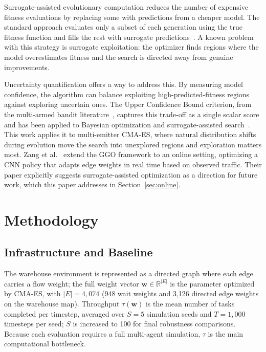 \documentclass[conference]{IEEEtran}
\begin{document}
Surrogate-assisted evolutionary computation reduces the number of expensive
fitness evaluations by replacing some with predictions from a cheaper
model. The standard approach evaluates only a subset of each generation
using the true fitness function and fills the rest with surrogate
predictions~\cite{jin2011}. A known problem with this strategy is surrogate
exploitation: the optimizer finds regions where the model overestimates
fitness and the search is directed away from genuine improvements.

Uncertainty quantification offers a way to address this. By measuring
model confidence, the algorithm can balance exploiting high-predicted-fitness
regions against exploring uncertain ones. The Upper Confidence Bound
criterion, from the multi-armed bandit literature~\cite{auer2002}, captures
this trade-off as a single scalar score and has been applied to Bayesian
optimization and surrogate-assisted search~\cite{shahriari2016}. This work
applies it to multi-emitter CMA-ES, where natural distribution shifts
during evolution move the search into unexplored regions and exploration
matters most. Zang et al.~\cite{zang2025} extend the GGO
framework to an online setting, optimizing a CNN policy that adapts edge
weights in real time based on observed traffic. Their paper explicitly
suggests surrogate-assisted optimization as a direction for future work,
which this paper addresses in Section~\ref{sec:online}.




\section{Methodology}

\subsection{Infrastructure and Baseline}

The warehouse environment is represented as a directed graph where each
edge carries a flow weight; the full weight vector $\mathbf{w} \in
\mathbb{R}^{|E|}$ is the parameter optimized by CMA-ES, with $|E| =
4{,}074$ (948 wait weights and 3,126 directed edge weights on the warehouse
map). Throughput $\tau(\mathbf{w})$ is the mean number of tasks completed
per timestep, averaged over $S = 5$ simulation seeds and $T = 1{,}000$
timesteps per seed; $S$ is increased to 100 for final robustness
comparisons. Because each evaluation requires a full multi-agent
simulation, $\tau$ is the main computational bottleneck.
\end{document}
